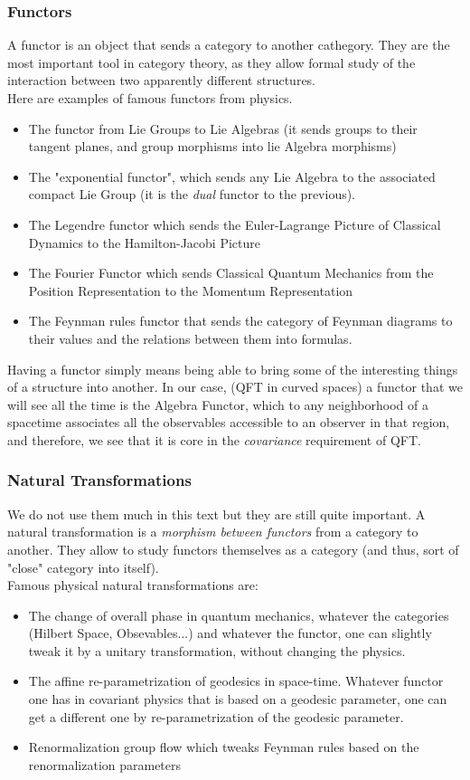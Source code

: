 \documentclass[a4paper,11pt]{article}
\numberwithin{equation}{section}
\theoremstyle{definition}
\begin{document}
    \subsubsection{Functors}
    A functor is an object that sends a category to another cathegory. They are the most important tool in category theory, as they allow formal study of the interaction between two apparently different structures.\\
    Here are examples of famous functors from physics.
    \begin{itemize}
        \item The functor from Lie Groups to Lie Algebras (it sends groups to their tangent planes, and group morphisms into lie Algebra morphisms)
        \item  The "exponential functor", which sends any Lie Algebra to the associated compact Lie Group (it is the \emph{dual} functor to the previous).
        \item The Legendre functor which sends the Euler-Lagrange Picture of Classical Dynamics to the Hamilton-Jacobi Picture
        \item The Fourier Functor which sends Classical Quantum Mechanics from the Position Representation to the Momentum Representation
        \item The Feynman rules functor that sends the category of Feynman diagrams to their values and the relations between them into formulas.
    \end{itemize}
    Having a functor simply means being able to bring some of the interesting things of a structure into another. In our case, (QFT in curved spaces) a functor that we will see all the time is the Algebra Functor, which to any neighborhood of a spacetime associates all the observables accessible to an observer in that region, and therefore, we see that it is core in the \emph{covariance} requirement of QFT.

    \subsubsection{Natural Transformations}
    We do not use them much in this \color{red} text \color{black} but they are still quite important. A natural transformation is a \emph{morphism between functors} from a category to another. They allow to study functors themselves as a category (and thus, sort of "close" category into itself).\\
    Famous physical natural transformations are:
    \begin{itemize}
        \item The change of overall phase in quantum mechanics, whatever the categories (Hilbert Space, Obsevables...) and whatever the functor, one can slightly tweak it by a unitary transformation, without changing the physics.
        \item The affine re-parametrization of geodesics in space-time. Whatever functor one has in covariant physics that is based on a geodesic parameter, one can get a different one by re-parametrization of the geodesic parameter.
        \item Renormalization group flow which tweaks Feynman rules based on the renormalization parameters
    \end{itemize}
\end{document}
